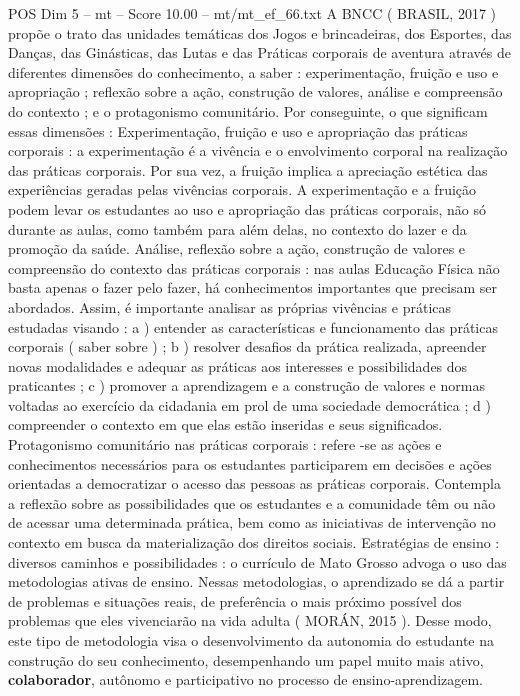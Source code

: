 \begin{textsample}{POS Dim 5 – mt – Score 10.00 – mt/mt\_ef\_66.txt}
A BNCC ( BRASIL, 2017 ) propõe o trato das unidades temáticas dos Jogos e brincadeiras, dos Esportes, das Danças, das Ginásticas, das Lutas e das Práticas corporais de aventura através de diferentes dimensões do conhecimento, a saber : experimentação, fruição e uso e apropriação ; reflexão sobre a ação, construção de valores, análise e compreensão do contexto ; e o protagonismo comunitário.
Por conseguinte, o que significam essas dimensões : Experimentação, fruição e uso e apropriação das práticas corporais : a experimentação é a vivência e o envolvimento corporal na realização das práticas corporais.
Por sua vez, a fruição implica a apreciação estética das experiências geradas pelas vivências corporais.
A experimentação e a fruição podem levar os estudantes ao uso e apropriação das práticas corporais, não só durante as aulas, como também para além delas, no contexto do lazer e da promoção da saúde.
Análise, reflexão sobre a ação, construção de valores e compreensão do contexto das práticas corporais : nas aulas Educação Física não basta apenas o fazer pelo fazer, há conhecimentos importantes que precisam ser abordados.
Assim, é importante analisar as próprias vivências e práticas estudadas visando : a ) entender as características e funcionamento das práticas corporais ( saber sobre ) ; b ) resolver desafios da prática realizada, apreender novas modalidades e adequar as práticas aos interesses e possibilidades dos praticantes ; c ) promover a aprendizagem e a construção de valores e normas voltadas ao exercício da cidadania em prol de uma sociedade democrática ; d ) compreender o contexto em que elas estão inseridas e seus significados.
Protagonismo comunitário nas práticas corporais : refere -se as ações e conhecimentos necessários para os estudantes participarem em decisões e ações orientadas a democratizar o acesso das pessoas as práticas corporais.
Contempla a reflexão sobre as possibilidades que os estudantes e a comunidade têm ou não de acessar uma determinada prática, bem como as iniciativas de intervenção no contexto em busca da materialização dos direitos sociais.
Estratégias de ensino : diversos caminhos e possibilidades : o currículo de Mato Grosso advoga o uso das metodologias ativas de ensino.
Nessas metodologias, o aprendizado se dá a partir de problemas e situações reais, de preferência o mais próximo possível dos problemas que eles vivenciarão na vida adulta ( MORÁN, 2015 ).
Desse modo, este tipo de metodologia visa o desenvolvimento da autonomia do estudante na construção do seu conhecimento, desempenhando um papel muito mais ativo, \textbf{colaborador}, autônomo e participativo no processo de ensino-aprendizagem.

\end{textsample}
